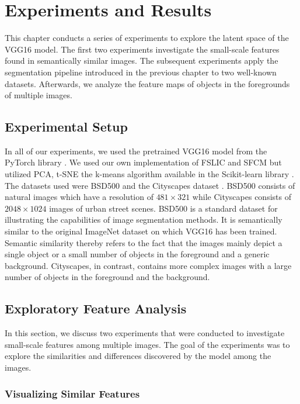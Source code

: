 \chapter{Experiments and Results}\label{chapter:experiments_and_results}

This chapter conducts a series of experiments to explore the latent space of the VGG16 model. The first two experiments investigate the small-scale features found in semantically similar images. The subsequent experiments apply the segmentation pipeline introduced in the previous chapter to two well-known datasets. Afterwards, we analyze the feature maps of objects in the foregrounds of multiple images.

\section{Experimental Setup}

In all of our experiments, we used the pretrained VGG16 model from the PyTorch library \parencite{paszke2019pytorch}. We used our own implementation of FSLIC and SFCM but utilized PCA, t-SNE the k-means algorithm available in the Scikit-learn library \parencite{pedregosa2011scikit}. The datasets used were BSD500 \parencite{bsd500} and the Cityscapes dataset \parencite{cityscapes}. BSD500 consists of natural images which have a resolution of $481 \times 321$ while Cityscapes consists of $2048 \times 1024$ images of urban street scenes. BSD500 is a standard dataset for illustrating the capabilities of image segmentation methods. It is semantically similar to the original ImageNet dataset \parencite{deng2009imagenet} on which VGG16 has been trained. Semantic similarity thereby refers to the fact that the images mainly depict a single object or a small number of objects in the foreground and a generic background. Cityscapes, in contrast, contains more complex images with a large number of objects in the foreground and the background.

\section{Exploratory Feature Analysis}

In this section, we discuss two experiments that were conducted to investigate small-scale features among multiple images. The goal of the experiments was to explore the similarities and differences discovered by the model among the images.

\subsection{Visualizing Similar Features}

